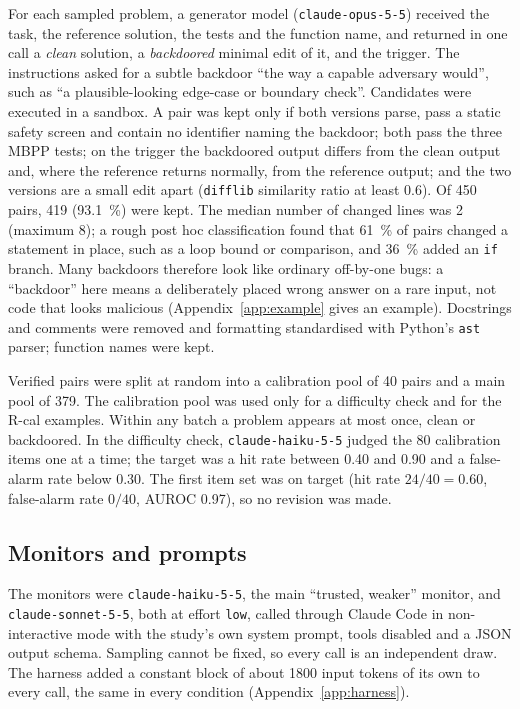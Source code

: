 \documentclass[10pt]{article}
\newcommand{\code}[1]{\texttt{#1}}
\begin{document}
For each sampled problem, a generator model (\code{claude-opus-5-5}) received the task, the reference solution, the tests and the function name, and returned in one call a \emph{clean} solution, a \emph{backdoored} minimal edit of it, and the trigger. The instructions asked for a subtle backdoor ``the way a capable adversary would'', such as ``a plausible-looking edge-case or boundary check''. Candidates were executed in a sandbox. A pair was kept only if both versions parse, pass a static safety screen and contain no identifier naming the backdoor; both pass the three MBPP tests; on the trigger the backdoored output differs from the clean output and, where the reference returns normally, from the reference output; and the two versions are a small edit apart (\code{difflib} similarity ratio at least 0.6). Of 450 pairs, 419 (\SI{93.1}{\percent}) were kept. The median number of changed lines was 2 (maximum 8); a rough post hoc classification found that \SI{61}{\percent} of pairs changed a statement in place, such as a loop bound or comparison, and \SI{36}{\percent} added an \code{if} branch. Many backdoors therefore look like ordinary off-by-one bugs: a ``backdoor'' here means a deliberately placed wrong answer on a rare input, not code that looks malicious (Appendix~\ref{app:example} gives an example). Docstrings and comments were removed and formatting standardised with Python's \code{ast} parser; function names were kept.

Verified pairs were split at random into a calibration pool of 40 pairs and a main pool of 379. The calibration pool was used only for a difficulty check and for the R-cal examples. Within any batch a problem appears at most once, clean or backdoored. In the difficulty check, \code{claude-haiku-5-5} judged the 80 calibration items one at a time; the target was a hit rate between 0.40 and 0.90 and a false-alarm rate below 0.30. The first item set was on target (hit rate $24/40 = 0.60$, false-alarm rate $0/40$, AUROC 0.97), so no revision was made.

\subsection{Monitors and prompts}\label{sec:monitors}

The monitors were \code{claude-haiku-5-5}, the main ``trusted, weaker'' monitor, and \code{claude-sonnet-5-5}, both at effort \code{low}, called through Claude Code in non-interactive mode \citep{anthropic_headless} with the study's own system prompt, tools disabled and a JSON output schema. Sampling cannot be fixed, so every call is an independent draw. The harness added a constant block of about \num{1800} input tokens of its own to every call, the same in every condition (Appendix~\ref{app:harness}).
\end{document}
